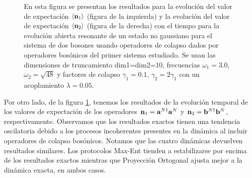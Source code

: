 \documentclass{report} %
\newcommand{\lgg}{\langle}
\newcommand{\rgg}{\rangle}
\numberwithin{equation}{section}
\begin{document}
\begin{figure}
    \centering
    \qquad
    \caption{En esta figura se presentan los resultados para la evolución del valor de expectación $\lgg {\bf n}_1 \rgg$ (figura de la izquierda) y la evolución del valor de expectación $\lgg {\bf n}_2 \rgg$ (figura de la derecha) con el tiempo para la evolución abierta resonante de un estado no gaussiano para el sistema de dos bosones usando operadores de colapso dados por operadores bosónicos del primer sistema estudiado. Se usan las dimensiones de truncamiento dim1=dim2=10, frecuencias $\omega_1 = 3.0$, $\omega_2 = \sqrt{48}$ y factores de colapso $\gamma_1 = 0.1$, $\gamma_2 = 2 \gamma_1$ con un acoplamiento $\lambda = 0.05$.}
    \label{ocupations_open1_res}
\end{figure}

Por otro lado, de la figura \ref{ocupations_open1_res},  tenemos los resultados de la evolución temporal de los valores de expectación de los operadores ${\bf n}_1 = {\bf a}^{N\dagger} {\bf a}^{N}$ y ${\bf n}_2 = {\mathbf b}^{N\dagger} {\mathbf b}^{N}$, respectivamente. 
Observamos que los resultados exactos tienen una tendencia oscilatoria debido a los procesos incoherentes presentes en la dinámica al incluir operadores de colapso bosónicos. Notamos que las cuatro dinámicas devuelven resultados similares. Los protocolos Max-Ent tienden a estabilizarse por encima de los resultados exactos mientras que Proyección Ortogonal ajusta mejor a la dinámica exacta, en ambos casos. \\
\end{document}
